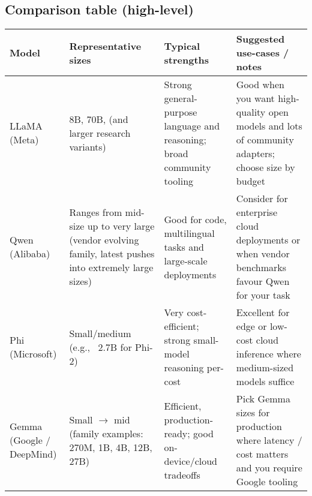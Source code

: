 \documentclass[a4paper, 12pt]{article}
\begin{document}
\subsection*{Comparison table (high-level)}
\begin{tcolorbox}[colback=gray!5!white,colframe=black,title=Model comparison at a glance]
\begin{tabular}{|p{2cm}|p{3cm}|p{4cm}|p{5.0cm}|}
\hline
\textbf{Model} & \textbf{Representative sizes} & \textbf{Typical strengths} & \textbf{Suggested use-cases / notes} \\
\hline
LLaMA (Meta) & 8B, 70B, (and larger research variants) & Strong general-purpose language and reasoning; broad community tooling & Good when you want high-quality open models and lots of community adapters; choose size by budget \\
\hline
Qwen (Alibaba) & Ranges from mid-size up to very large (vendor evolving family, latest pushes into extremely large sizes) & Good for code, multilingual tasks and large-scale deployments & Consider for enterprise cloud deployments or when vendor benchmarks favour Qwen for your task \\
\hline
Phi (Microsoft) & Small/medium (e.g., ~2.7B for Phi-2) & Very cost-efficient; strong small-model reasoning per-cost & Excellent for edge or low-cost cloud inference where medium-sized models suffice \\
\hline
Gemma (Google / DeepMind) & Small $\to$ mid (family examples: 270M, 1B, 4B, 12B, 27B) & Efficient, production-ready; good on-device/cloud tradeoffs & Pick Gemma sizes for production where latency / cost matters and you require Google tooling \\
\hline
\end{tabular}
\end{tcolorbox}
\end{document}
